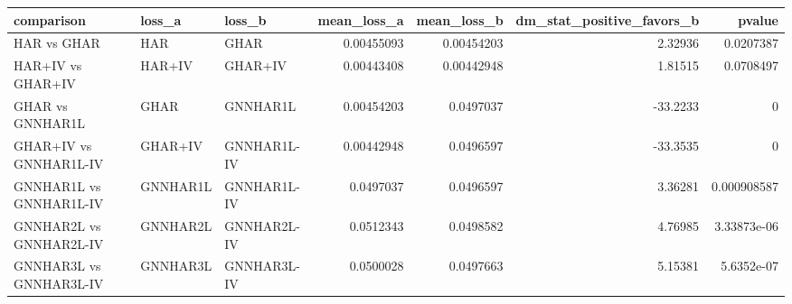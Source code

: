 \begin{tabular}{lllrrrr}
\toprule
comparison & loss_a & loss_b & mean_loss_a & mean_loss_b & dm_stat_positive_favors_b & pvalue \\
\midrule
HAR vs GHAR & HAR & GHAR & 0.00455093 & 0.00454203 & 2.32936 & 0.0207387 \\
HAR+IV vs GHAR+IV & HAR+IV & GHAR+IV & 0.00443408 & 0.00442948 & 1.81515 & 0.0708497 \\
GHAR vs GNNHAR1L & GHAR & GNNHAR1L & 0.00454203 & 0.0497037 & -33.2233 & 0 \\
GHAR+IV vs GNNHAR1L-IV & GHAR+IV & GNNHAR1L-IV & 0.00442948 & 0.0496597 & -33.3535 & 0 \\
GNNHAR1L vs GNNHAR1L-IV & GNNHAR1L & GNNHAR1L-IV & 0.0497037 & 0.0496597 & 3.36281 & 0.000908587 \\
GNNHAR2L vs GNNHAR2L-IV & GNNHAR2L & GNNHAR2L-IV & 0.0512343 & 0.0498582 & 4.76985 & 3.33873e-06 \\
GNNHAR3L vs GNNHAR3L-IV & GNNHAR3L & GNNHAR3L-IV & 0.0500028 & 0.0497663 & 5.15381 & 5.6352e-07 \\
\bottomrule
\end{tabular}
